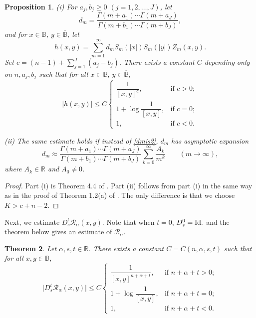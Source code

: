 \documentclass{amsart}
\newtheorem{theorem}{Theorem}[section]
\newtheorem{proposition}[theorem]{Proposition}
\theoremstyle{definition}
\theoremstyle{remark}
\begin{document}
\begin{proposition}\label{PEsth}
(i) For $a_j,b_j\ge 0$ $(j=1,2,\dots,J)$, let
\begin{equation}\label{dmis2}
d_m=\frac{\Gamma(m+a_1)\cdots\Gamma(m+a_J)}{\Gamma(m+b_1)\cdots\Gamma(m+b_J)},
\end{equation}
and for $x\in\mathbb B$, $y\in\overline{\mathbb B}$, let
\begin{equation*}
h(x,y)=\sum_{m=1}^\infty d_m S_m(\vert x\vert)S_m(\vert y\vert) Z_m(x,y).
\end{equation*}
Set $c=(n-1)+\sum_{j=1}^J(a_j-b_j)$.
There exists a constant $C$ depending only on $n,a_j,b_j$ such that for all
$x\in\mathbb B$, $y\in\overline{\mathbb B}$,
\begin{equation*}
\vert h(x,y)\vert\leq C
\begin{cases}
\dfrac{1}{[x,y]^{c}},&\text{if $c>0$};\\
1+\log\dfrac{1}{[x,y]},&\text{if $c=0$};\\
1,&\text{if $c<0$}.
\end{cases}
\end{equation*}

(ii) The same estimate holds if instead of \eqref{dmis2}, $d_m$ has asymptotic
expansion
\begin{equation}\label{dm2asym}
d_m\approx\frac{\Gamma(m+a_1)\cdots\Gamma(m+a_J)}{\Gamma(m+b_1)\cdots\Gamma(m+b_J)}
\sum_{k=0}^\infty\frac{A_k}{m^k}
\qquad (m\to\infty),
\end{equation}
where $A_k\in\mathbb R$ and $A_0\neq 0$.
\end{proposition}

\begin{proof}
Part (i) is Theorem 4.4 of \cite{U}.
Part (ii) follows from part (i) in the same way as in the proof of
Theorem 1.2(a) of \cite{U}.
The only difference is that we choose $K>c+n-2$.
\end{proof}

Next, we estimate $D^t_s\mathcal R_\alpha(x,y)$.
Note that when $t=0$, $D^0_s=\textup{Id}.$ and the theorem below gives an
estimate of $\mathcal R_\alpha$.

\begin{theorem}\label{TDstKernel}
Let $\alpha,s,t\in\mathbb R$.
There exists a constant $C=C(n,\alpha,s,t)$ such that for all $x,y\in\mathbb B$,
\begin{equation*}
\vert D^t_s\mathcal R_\alpha(x,y)\vert\le C
\begin{cases}
\dfrac{1}{[x,y]^{n+\alpha+t}},&\text{if $n+\alpha+t>0$};\\
1+\log\dfrac{1}{[x,y]},&\text{if $n+\alpha+t=0$};\\
1,&\text{if $n+\alpha+t<0$}.
\end{cases}
\end{equation*}
\end{theorem}
\end{document}
